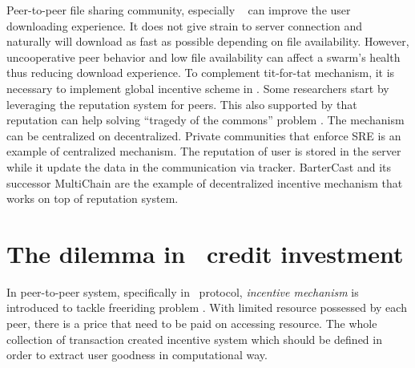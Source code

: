 Peer-to-peer file sharing community, especially \bt~ can improve the user downloading experience. It does not give strain to server connection and naturally will download as fast as possible depending on file availability. However, uncooperative peer behavior and low file availability can affect a swarm's health thus reducing download experience. To complement tit-for-tat mechanism, it is necessary to implement global incentive scheme in \bt. Some researchers start by leveraging the reputation system for peers. This also supported by \citeauthor{2002:reputationtotragedy:milinski} that reputation can help solving ``tragedy of the commons'' problem \cite{2002:reputationtotragedy:milinski}. The mechanism can be centralized on decentralized. Private communities that enforce SRE is an example of centralized mechanism. The reputation of user is stored in the server while it update the data in the communication via tracker. BarterCast \cite{2009:bartercast:meulpolder} and its successor MultiChain \cite{2015:multichain:norberhuis} are the example of decentralized incentive mechanism that works on top of reputation system. 


\section{The dilemma in \bt~credit investment}
In peer-to-peer system, specifically in \bt~protocol, \textit{incentive mechanism} is introduced to tackle freeriding problem \cite{2003:bittorrent:cohen}. With limited resource possessed by each peer, there is a price that need to be paid on accessing resource. The whole collection of transaction created incentive system which should be defined in order to extract user goodness in computational way.

